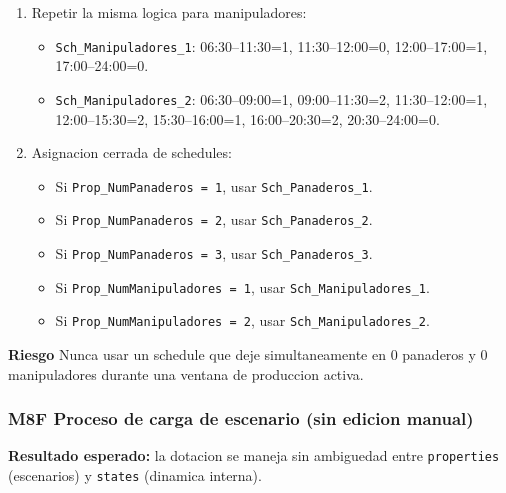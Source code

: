 \documentclass[11pt]{article}
\newcommand{\simio}[1]{\texttt{#1}}
\newcommand{\state}[1]{\texttt{#1}}
\newcommand{\risk}{\textcolor{rojoriesgo}{\textbf{Riesgo}}}
\begin{document}
\begin{enumerate}
\begin{enumerate}
\begin{itemize}
      \item 15:30--16:00 = 2 (colacion turno C)
      \item 16:00--19:30 = 2
      \item 19:30--24:00 = 0
    \end{itemize}
  \end{enumerate}
  \item Repetir la misma logica para manipuladores:
  \begin{itemize}
    \item \simio{Sch\_Manipuladores\_1}: 06:30--11:30=1, 11:30--12:00=0, 12:00--17:00=1, 17:00--24:00=0.
    \item \simio{Sch\_Manipuladores\_2}: 06:30--09:00=1, 09:00--11:30=2, 11:30--12:00=1, 12:00--15:30=2, 15:30--16:00=1, 16:00--20:30=2, 20:30--24:00=0.
  \end{itemize}
  \item Asignacion cerrada de schedules:
  \begin{itemize}
    \item Si \state{Prop\_NumPanaderos = 1}, usar \simio{Sch\_Panaderos\_1}.
    \item Si \state{Prop\_NumPanaderos = 2}, usar \simio{Sch\_Panaderos\_2}.
    \item Si \state{Prop\_NumPanaderos = 3}, usar \simio{Sch\_Panaderos\_3}.
    \item Si \state{Prop\_NumManipuladores = 1}, usar \simio{Sch\_Manipuladores\_1}.
    \item Si \state{Prop\_NumManipuladores = 2}, usar \simio{Sch\_Manipuladores\_2}.
  \end{itemize}
\end{enumerate}

\risk{} Nunca usar un schedule que deje simultaneamente en 0 panaderos y 0 manipuladores durante una ventana de produccion activa.

\subsubsection{M8F Proceso de carga de escenario (sin edicion manual)}
\textbf{Resultado esperado:} la dotacion se maneja sin ambiguedad entre \simio{properties} (escenarios) y \simio{states} (dinamica interna).
\end{document}
